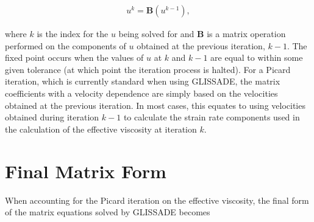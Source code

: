 \begin{align*}
u^{k}=\mathbf{B}\left( u^{k-1} \right),
\end{align*}

where $k$ is the index for the $u$ being solved for and \textbf{B} is a matrix operation performed on the components of $u$ obtained at the previous iteration, $k-1$. The fixed point occurs when the values of $u$ at $k$ and $k-1$ are equal to within some given tolerance (at which point the iteration process is halted). %
For a Picard iteration, which is currently standard when using GLISSADE, the matrix coefficients with a velocity dependence are simply based on the velocities obtained at the previous iteration. In most cases, this equates to using velocities obtained during iteration $k-1$ to calculate the strain rate components used in the calculation of the effective viscosity at iteration $k$.

\section{Final Matrix Form}
When accounting for %
the Picard iteration on the effective viscosity, the final form of the matrix equations solved by GLISSADE becomes 


